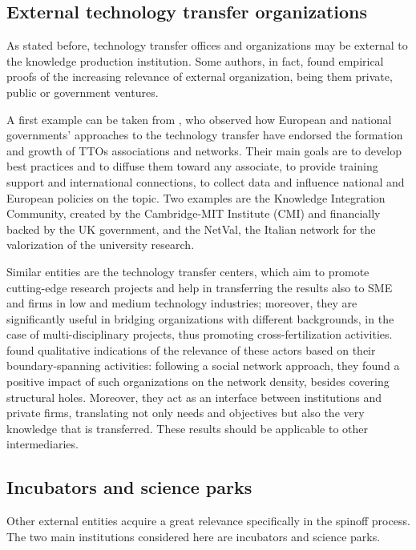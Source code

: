 \subsection{External technology transfer organizations}

As stated before, technology transfer offices and organizations may be external to the knowledge production institution. Some authors, in fact, found empirical proofs of the increasing relevance of external organization, being them private, public or government ventures.

A first example can be taken from \citet{Geuna2009}, who observed how European and national governments' approaches to the technology transfer have endorsed the formation and growth of TTOs associations and networks. Their main goals are to develop best practices and to diffuse them toward any associate, to provide training support and international connections, to collect data and influence national and European policies on the topic. Two examples are the Knowledge Integration Community, created by the Cambridge-MIT Institute (CMI) and financially backed by the UK government, and the NetVal, the Italian network for the valorization of the university research.

Similar entities are the technology transfer centers, which aim to promote cutting-edge research projects and help in transferring the results also to SME and firms in low and medium technology industries; moreover, they are significantly useful in bridging organizations with different backgrounds, in the case of multi-disciplinary projects, thus promoting cross-fertilization activities. \citet{Comacchio2012} found qualitative indications of the relevance of these actors based on their boundary-spanning activities: following a social network approach, they found a positive impact of such organizations on the network density, besides covering structural holes. Moreover, they act as an interface between institutions and private firms, translating not only needs and objectives but also the very knowledge that is transferred. These results should be applicable to other intermediaries.

\subsection{Incubators and science parks}
Other external entities acquire a great relevance specifically in the spinoff process. The two main institutions considered here are incubators and science parks. 

